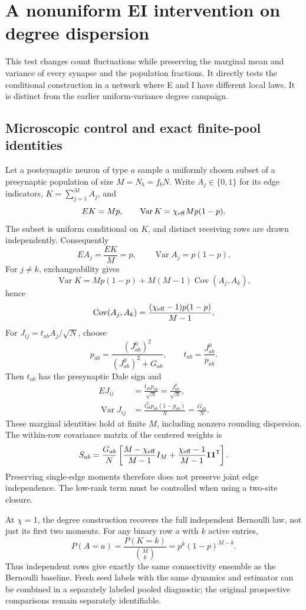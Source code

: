 \section{A nonuniform EI intervention on degree dispersion}
\label{sec:nonuniform-degree}

This test changes count fluctuations while preserving the marginal mean and
variance of every synapse and the population fractions. It directly tests the
conditional construction in a network where E and I have different local
laws. It is distinct from the earlier uniform-variance degree campaign.

\subsection{Microscopic control and exact finite-pool identities}

Let a postsynaptic neuron of type \(a\) sample a uniformly chosen subset of a
presynaptic population of size \(M=N_b=f_bN\). Write \(A_j\in\{0,1\}\) for its
edge indicators, \(K=\sum_{j=1}^M A_j\), and
\[
 E K=Mp,\qquad
 \operatorname{Var}K=\chi_{\rm eff}Mp(1-p).
\]
The subset is uniform conditional on \(K\), and distinct receiving rows are
drawn independently. Consequently
\[
 E A_j=\frac{E K}{M}=p,\qquad
 \operatorname{Var}A_j=p(1-p).
\]
For \(j\ne k\), exchangeability gives
\[
 \operatorname{Var}K
 =M p(1-p)+M(M-1)\operatorname{Cov}(A_j,A_k),
\]
hence
\[
 \operatorname{Cov}(A_j,A_k)
 =\frac{(\chi_{\rm eff}-1)p(1-p)}{M-1}.
\]
For \(J_{ij}=t_{ab}A_j/\sqrt N\), choose
\[
 p_{ab}=\frac{(J^0_{ab})^2}{(J^0_{ab})^2+G_{ab}},
 \qquad t_{ab}=\frac{J^0_{ab}}{p_{ab}}.
\]
Then \(t_{ab}\) has the presynaptic Dale sign and
\begin{align*}
 E J_{ij}&=\frac{t_{ab}p_{ab}}{\sqrt N}
          =\frac{J^0_{ab}}{\sqrt N},\\
 \operatorname{Var}J_{ij}
 &=\frac{t_{ab}^2p_{ab}(1-p_{ab})}{N}
   =\frac{G_{ab}}{N}.
\end{align*}
These marginal identities hold at finite \(M\), including nonzero rounding
dispersion. The within-row covariance matrix of the centered weights is
\[
 S_{ab}=\frac{G_{ab}}N
 \left[
 \frac{M-\chi_{\rm eff}}{M-1}I_M+
 \frac{\chi_{\rm eff}-1}{M-1}{\boldsymbol 1}{\boldsymbol 1}^{\mathsf T}
 \right].
\]
Preserving single-edge moments therefore does not preserve joint edge
independence. The low-rank term must be controlled when using a two-site
closure.

At \(\chi=1\), the degree construction recovers the full independent
Bernoulli law, not just its first two moments. For any binary row \(a\) with
\(k\) active entries,
\[
 P(A=a)=\frac{P(K=k)}{\binom Mk}
       =p^k(1-p)^{M-k}.
\]
Thus independent rows give exactly the same connectivity ensemble as the
Bernoulli baseline. Fresh seed labels with the same dynamics and estimator
can be combined in a separately labeled pooled diagnostic; the original
prospective comparisons remain separately identifiable.

